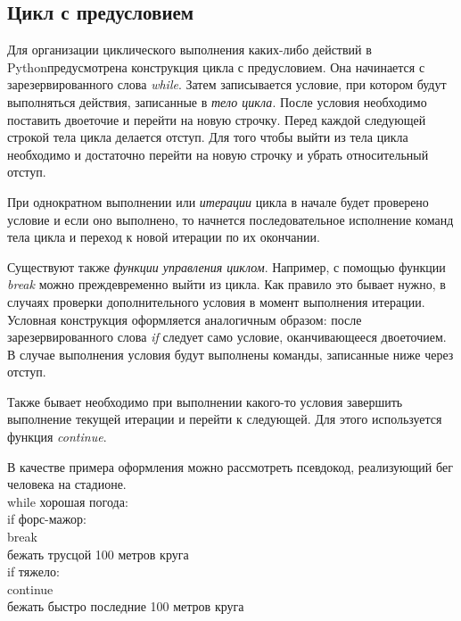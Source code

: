 \documentclass[a4paper, fleqn]{article}
\newcommand*{\py}{Python}
\begin{document}
	\subsection*{Цикл с предусловием}
	
	Для организации циклического выполнения каких-либо действий в \py предусмотрена конструкция цикла с предусловием. Она начинается с зарезервированного слова \emph{while}. Затем записывается условие, при котором будут выполняться действия, записанные в \emph{тело цикла}. После условия необходимо поставить двоеточие и перейти на новую строчку.
	Перед каждой следующей строкой тела цикла делается отступ.
	Для того чтобы выйти из тела цикла необходимо и достаточно перейти на новую строчку и убрать относительный отступ.
	
	При однократном выполнении  или \emph{итерации} цикла в начале будет проверено условие и если оно выполнено, то начнется последовательное исполнение команд тела цикла и переход к новой итерации по их окончании. 
	
	Существуют также \emph{функции управления циклом}. Например, с помощью функции \emph{break} можно преждевременно выйти из цикла. Как правило это бывает нужно, в случаях проверки дополнительного условия в момент выполнения итерации. Условная конструкция оформляется аналогичным образом: после зарезервированного слова \emph{if} следует само условие, оканчивающееся двоеточием. В случае выполнения условия будут выполнены команды, записанные ниже через отступ.
	
	Также бывает необходимо при выполнении какого-то условия завершить выполнение текущей итерации и перейти к следующей.
	Для этого используется функция \emph{continue}.
	
	В качестве примера оформления можно рассмотреть псевдокод, реализующий бег человека на стадионе. 
	\\
	while хорошая погода:\\
	\qquad if форс-мажор:\\
	\qquad \qquad break\\
	\qquad бежать трусцой 100 метров круга\\
	\qquad if тяжело:\\
	\qquad \qquad continue\\
	\qquad бежать быстро последние 100 метров круга
	
\end{document}
